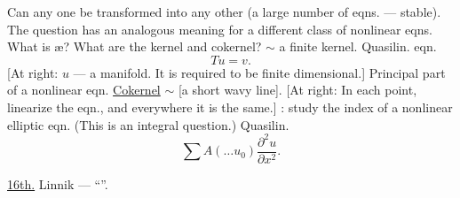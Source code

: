 Can any one be transformed into any other
(a large number of eqns. --- stable).
The question has an analogous meaning for a different class of nonlinear eqns. What is æ?
What are the kernel and cokernel?
$\sim$ a finite kernel.
Quasilin. eqn.
\begin{equation*}
Tu=v.
\end{equation*}
[At right: $u$ --- a manifold. It is required to be finite dimensional.]
Principal part of a nonlinear eqn.
\underline{Cokernel} $\sim$ [a short wavy line].
[At right: In each point, linearize the eqn., and everywhere it is the same.]
: study the index of a nonlinear elliptic eqn.
(This is an integral question.)
Quasilin.
\begin{equation*}
\sum A(\ldots u_0)\frac{\partial^2u}{\partial x^2}.
\end{equation*}

\par\noindent\begin{minipage}{\linewidth}
\underline{\textcolor{orange!65!black}{16th.}} Linnik --- “”.
\end{minipage}\par

